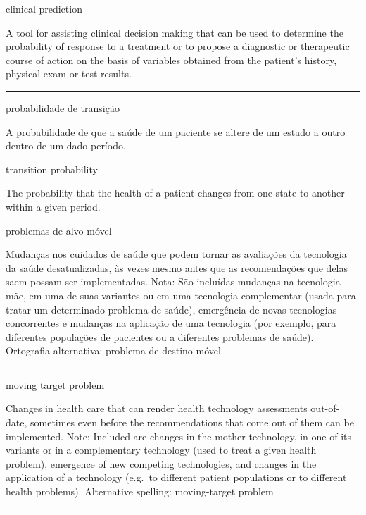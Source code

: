 \documentclass[
]{book}
\begin{document}
clinical prediction

A tool for assisting clinical decision making that can be used to determine the probability of response to a treatment or to propose a diagnostic or therapeutic course of action on the basis of variables obtained from the patient's history, physical exam or test results.

\begin{center}\rule{0.5\linewidth}{0.5pt}\end{center}

probabilidade de transição

A probabilidade de que a saúde de um paciente se altere de um estado a outro dentro de um dado período.

transition probability

The probability that the health of a patient changes from one state to another within a given period.

problemas de alvo móvel

Mudanças nos cuidados de saúde que podem tornar as avaliações da tecnologia da saúde desatualizadas, às vezes mesmo antes que as recomendações que delas saem possam ser implementadas. Nota: São incluídas mudanças na tecnologia mãe, em uma de suas variantes ou em uma tecnologia complementar (usada para tratar um determinado problema de saúde), emergência de novas tecnologias concorrentes e mudanças na aplicação de uma tecnologia (por exemplo, para diferentes populações de pacientes ou a diferentes problemas de saúde). Ortografia alternativa: problema de destino móvel

\begin{center}\rule{0.5\linewidth}{0.5pt}\end{center}

moving target problem

Changes in health care that can render health technology assessments out-of-date, sometimes even before the recommendations that come out of them can be implemented. Note: Included are changes in the mother technology, in one of its variants or in a complementary technology (used to treat a given health problem), emergence of new competing technologies, and changes in the application of a technology (e.g.~to different patient populations or to different health problems). Alternative spelling: moving-target problem

\begin{center}\rule{0.5\linewidth}{0.5pt}\end{center}
\end{document}
